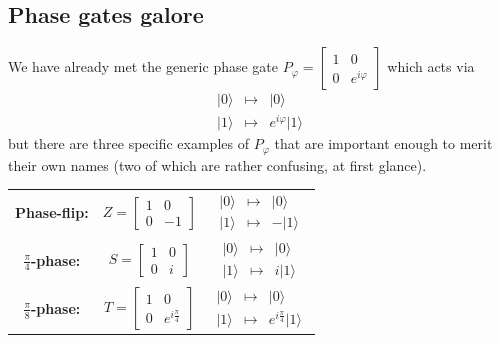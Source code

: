 \documentclass[fleqn,a4paper]{article}
\newenvironment{idea}{\everypar{\setlength{\parindent}{1.5em}}}{}
\theoremstyle{definition}
\theoremstyle{definition}
\theoremstyle{definition}
\theoremstyle{definition}
\theoremstyle{remark}
\begin{document}
\hypertarget{phase-gates-galore}{%
\subsection{Phase gates galore}\label{phase-gates-galore}}

We have already met the generic phase gate \(P_\varphi=\begin{bmatrix}1&0\\0&e^{i\varphi}\end{bmatrix}\) which acts via
\[
  \begin{array}{lcr}
    |0\rangle&\longmapsto&|0\rangle
  \\|1\rangle&\longmapsto&e^{i\varphi}|1\rangle
  \end{array}
\]
but there are three specific examples of \(P_\varphi\) that are important enough to merit their own names (two of which are rather confusing, at first glance).

\begin{idea}

\centering
\begin{tabular}{ccc}
  \textbf{Phase-flip:}
  & $Z = \begin{bmatrix}1&0\\0&-1\end{bmatrix}$
  & $\begin{array}{lcr}|0\rangle&\longmapsto&|0\rangle\\|1\rangle&\longmapsto&-|1\rangle\end{array}$
\\[2em]
  \textbf{$\frac{\pi}{4}$-phase:}
  & $S = \begin{bmatrix}1&0\\0&i\end{bmatrix}$
  & $\begin{array}{lcr}|0\rangle&\longmapsto&|0\rangle\\|1\rangle&\longmapsto&i|1\rangle\end{array}$
\\[2em]
  \textbf{$\frac{\pi}{8}$-phase:}
  & $T = \begin{bmatrix}1&0\\0&e^{i\frac{\pi}{4}}\end{bmatrix}$
  & $\begin{array}{lcr}|0\rangle&\longmapsto&|0\rangle\\|1\rangle&\longmapsto&e^{i\frac{\pi}{4}}|1\rangle\end{array}$
\end{tabular}

\end{idea}
\end{document}
